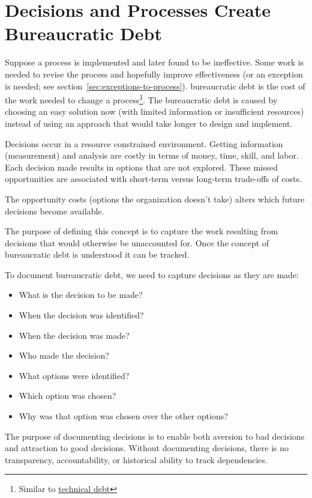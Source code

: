 \section{Decisions and Processes Create Bureaucratic Debt\label{sec:bureaucratic_debt}}


Suppose a \gls{process} is implemented and later found to be ineffective. Some work is needed to revise the process and hopefully improve effectiveness (or an exception is needed; see section~\ref{sec:exceptions-to-process}). \gls{bureaucratic debt} is the cost of the work needed to change a process\footnote{Similar to \href{https://en.wikipedia.org/wiki/Technical_debt}{technical debt}}. The bureaucratic debt is caused by choosing an easy solution now (with limited information or insufficient resources) instead of using an approach that would take longer to design and implement.


Decisions occur in a resource constrained environment.
Getting information (measurement) and analysis are costly in terms of money, time, skill, and labor.
Each decision made results in options that are not explored. These missed opportunities are associated with short-term versus long-term trade-offs of costs.

The opportunity costs (options the organization doesn't take) alters which future decisions become available.

The purpose of defining this concept is to capture the work resulting from decisions that would otherwise be unaccounted for.
Once the concept of bureaucratic debt is understood it can be tracked.

To document bureaucratic debt, we need to capture decisions as they are made:
\begin{itemize}
    \item What is the decision to be made?
    \item When the decision was identified?
    \item When the decision was made?
    \item Who made the decision?
    \item What options were identified?
    \item Which option was chosen?
    \item Why was that option was chosen over the other options?
\end{itemize}
The purpose of documenting decisions is to enable both aversion to bad decisions and attraction to good decisions. Without documenting decisions, there is no transparency, accountability, or historical ability to track dependencies. 

